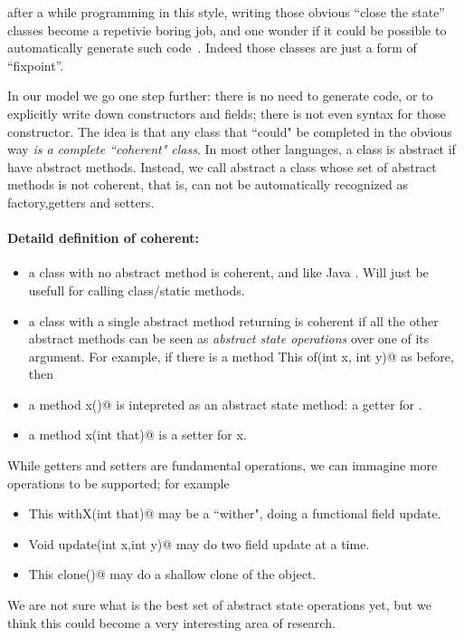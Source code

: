 \noindent after a while programming in this style, 
writing those obvious ``close the state'' classes become a
repetivie boring job, and one wonder
if it could be possible to automatically generate such code~\cite{wang2016classless}.
Indeed those classes are just a form of ``fixpoint''.

In our model we go one step further: there is no need to generate code, or to explicitly
write down constructors and fields; there is not even syntax for those
constructor.
The idea is that any class that ``could" be completed in the obvious way
\emph{is a complete ``coherent" class}.
In most other languages, a class is abstract if have abstract methods.
Instead, we call abstract a class whose set of abstract methods is not
coherent, that is, can not be automatically recognized as factory,getters and setters.
  
\paragraph*{Detaild definition of coherent:}
\begin{itemize}
\item a class with no abstract method is coherent, and like Java \Q@Math@.
Will just be usefull for calling class/static methods.
\item a class with a single abstract \Q@class@ method returning \Q@This@
is coherent if all the other abstract methods can be seen as \emph{abstract state
operations} over one of its argument.
For example,
if there is a \Q@class method This of(int x, int y)@ as before,
then
\item a method \Q@int x()@ is intepreted as an abstract state method: a getter for \Q@x@.
\item a method \Q@Void x(int that)@ is a setter for x.
\end{itemize}

While getters and setters are fundamental operations, we can immagine
more operations to be supported; for example
\begin{itemize}
\item \Q@method This withX(int that)@
may be a ``wither", doing a functional field update.
\item \Q@method Void update(int x,int y)@
may do two field update at a time.
\item\Q@method This clone()@ may do a shallow clone of the object.
\end{itemize}

We are not sure what is the best set of abstract state operations yet, but we think this could become a very interesting area of research.
  
